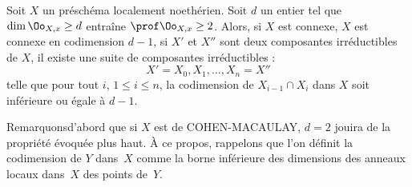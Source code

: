 \begin{corollaire} \label{III.3.7}
Soit $X$ un pr\'esch\'ema localement noeth\'erien. Soit $d$ un entier tel que $\dim \Oo_{X, x} \geq d$ entra\^ine $\prof \Oo_{X, x} \geq 2$. Alors, si $X$ est connexe, $X$ est connexe en codimension $d-1$, \ie si $X'$ et $X''$ sont deux composantes irr\'eductibles de $X$, il existe une suite de composantes irr\'eductibles :
\[
X'=X_0, X_1, \ldots, X_n=X''
\]
telle que pour tout $i$, $1\leq i \leq n$, la codimension de $X_{i-1}\cap X_i$ dans $X$ soit inf\'erieure ou \'egale \`a $d-1$.
\end{corollaire}

Remarquons\pageoriginale d'abord que si $X$ est de COHEN-MACAULAY, $d=2$ jouira de la propri\'et\'e \'evoqu\'ee plus haut. \`A ce propos, rappelons que l'on d\'efinit la codimension de $Y$ dans~$X$ comme la borne inf\'erieure des dimensions des anneaux locaux dans~$X$ des points de~$Y$.

